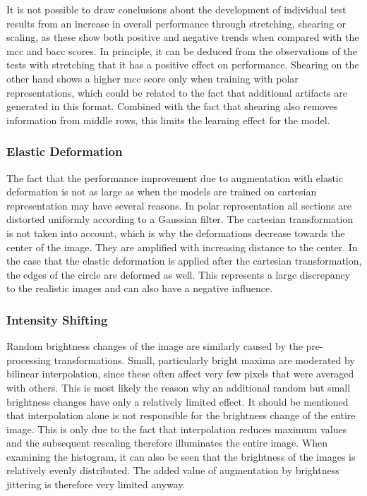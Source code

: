 It is not possible to draw conclusions about the development of individual test results from an increase in overall performance through stretching, shearing or scaling, as these show both positive and negative trends when compared with the \acrshort{mcc} and \acrshort{bacc} scores. In principle, it can be deduced from the observations of the tests with stretching that it has a positive effect on performance. Shearing on the other hand shows a higher \acrshort{mcc} score only when training with polar representations, which could be related to the fact that additional artifacts are generated in this format. Combined with the fact that shearing also removes information from middle rows, this limits the learning effect for the model.

\subsubsection{Elastic Deformation}

The fact that the performance improvement due to augmentation with elastic deformation is not as large as when the models are trained on cartesian representation may have several reasons. In polar representation all sections are distorted uniformly according to a Gaussian filter. The cartesian transformation is not taken into account, which is why the deformations decrease towards the center of the image. They are amplified with increasing distance to the center. In the case that the elastic deformation is applied after the cartesian transformation, the edges of the circle are deformed as well. This represents a large discrepancy to the realistic images and can also have a negative influence.

\subsubsection{Intensity Shifting}

Random brightness changes of the image are similarly caused by the pre-processing transformations. Small, particularly bright maxima are moderated by bilinear interpolation, since these often affect very few pixels that were averaged with others. This is most likely the reason why an additional random but small brightness changes have only a relatively limited effect. It should be mentioned that interpolation alone is not responsible for the brightness change of the entire image. This is only due to the fact that interpolation reduces maximum values and the subsequent rescaling therefore illuminates the entire image. When examining the histogram, it can also be seen that the brightness of the images is relatively evenly distributed. The added value of augmentation by brightness jittering is therefore very limited anyway.


